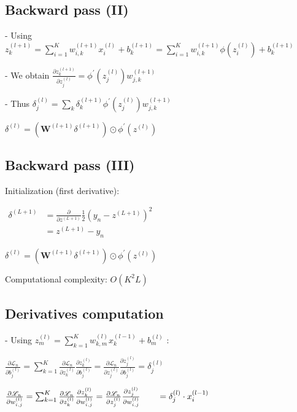 \subsection*{Backward pass (II)}
- Using $z_{k}^{(l+1)}=\sum_{i=1}^{K} w_{i, k}^{(l+1)} x_{i}^{(l)}+b_{k}^{(l+1)}=\sum_{i=1}^{K} w_{i, k}^{(l+1)} \phi\left(z_{i}^{(l)}\right)+b_{k}^{(l+1)}$

- We obtain $\frac{\partial z_{k}^{(l+1)}}{\partial z_{j}^{(l)}}=\phi^{\prime}\left(z_{j}^{(l)}\right) w_{j, k}^{(l+1)}$

- Thus
$
\delta_{j}^{(l)}=\sum_{k} \delta_{k}^{(l+1)} \phi^{\prime}\left(z_{j}^{(l)}\right) w_{j, k}^{(l+1)}
$

$
\delta^{(l)}=\left(\mathbf{W}^{(l+1)} \delta^{(l+1)}\right) \odot \phi^{\prime}\left(z^{(l)}\right)
$

\subsection*{Backward pass (III)}
Initialization (first derivative):

$
\begin{aligned}
\delta^{(L+1)} & =\frac{\partial}{\partial z^{(L+1)}} \frac{1}{2}\left(y_{n}-z^{(L+1)}\right)^{2} \\
& =z^{(L+1)}-y_{n}
\end{aligned}
$

$
\delta^{(l)}=\left(\mathbf{W}^{(l+1)} \delta^{(l+1)}\right) \odot \phi^{\prime}\left(z^{(l)}\right)
$

Computational complexity: $O\left(K^{2} L\right)$

\subsection*{Derivatives computation}


- Using $z_{m}^{(l)}=\sum_{k=1}^{K} w_{k, m}^{(l)} x_{k}^{(l-1)}+b_{m}^{(l)}$ :

$\frac{\partial \mathscr{L}_{n}}{\partial b_{j}^{(l)}}=\sum_{k=1}^{K} \frac{\partial \mathscr{L}_{n}}{\partial z_{k}^{(l)}} \frac{\partial z_{k}^{(l)}}{\partial b_{j}^{(l)}}=\frac{\partial \mathscr{L}_{n}}{\partial z_{j}^{(l)}} \frac{\partial z_{j}^{(l)}}{\partial b_{j}^{(l)}}=\delta_{j}^{(l)}$

$\frac{\partial \mathscr{L}_{n}}{\partial w_{i, j}^{(l)}}=\sum_{k=1}^{K} \frac{\partial \mathscr{L}_{n}}{\partial z_{k}^{(l)}} \frac{\partial z_{k}^{(l)}}{\partial w_{i, j}^{(l)}}=\frac{\partial \mathscr{L}_{n}}{\partial z_{j}^{(l)}} \frac{\partial z_{j}^{(l)}}{\partial w_{i, j}^{(l)}}\\ \qquad =\delta_{j}^{(l)} \cdot x_{i}^{(l-1)}$

